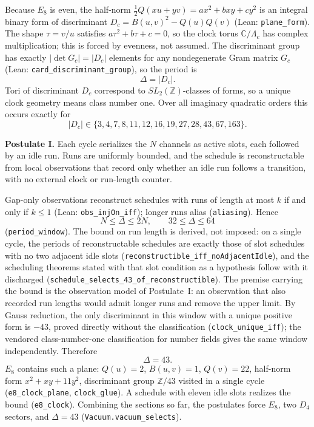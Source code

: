 Because $E_8$ is even, the half-norm $\tfrac12Q(xu+yv)=ax^2+bxy+cy^2$ is an integral binary form of discriminant $D_c=B(u,v)^2-Q(u)Q(v)$ (Lean: \texttt{plane\_form}). The shape $\tau=v/u$ satisfies $a\tau^2+b\tau+c=0$, so the clock torus $\mathbb C/\Lambda_c$ has complex multiplication; this is forced by evenness, not assumed. The discriminant group has exactly $|\det G_c|=|D_c|$ elements for any nondegenerate Gram matrix $G_c$ (Lean: \texttt{card\_discriminant\_group}), so the period is
\begin{equation}
\Delta=|D_c|.
\end{equation}
Tori of discriminant $D_c$ correspond to $SL_2(\mathbb Z)$-classes of forms\cite{silverman_advanced_1994}, so a unique clock geometry means class number one. Over all imaginary quadratic orders this occurs exactly for\cite{stark_complete_1967}
\begin{equation}
\label{eq:heegner_modulus_set}
|D_c|\in\{3,4,7,8,11,12,16,19,27,28,43,67,163\}.
\end{equation}

\label{sec:fundamental_resonance_filter2}
\label{sec:relational_time_constraint}
\textbf{Postulate I.} Each cycle serializes the $N$ channels as active slots, each followed by an idle run. Runs are uniformly bounded, and the schedule is reconstructable from local observations that record only whether an idle run follows a transition, with no external clock or run-length counter.

Gap-only observations reconstruct schedules with runs of length at most $k$ if and only if $k\le1$ (Lean: \texttt{obs\_injOn\_iff}); longer runs alias (\texttt{aliasing}). Hence
\begin{equation}
N\le\Delta\le2N,\qquad 32\le\Delta\le64
\end{equation}
(\texttt{period\_window}). The bound on run length is derived, not imposed: on a single cycle, the periods of reconstructable schedules are exactly those of slot schedules with no two adjacent idle slots (\texttt{reconstructible\_iff\_noAdjacentIdle}), and the scheduling theorems stated with that slot condition as a hypothesis follow with it discharged (\texttt{schedule\_selects\_43\_of\_reconstructible}). The premise carrying the bound is the observation model of Postulate~I: an observation that also recorded run lengths would admit longer runs and remove the upper limit. By Gauss reduction, the only discriminant in this window with a unique positive form is $-43$, proved directly without the classification (\texttt{clock\_unique\_iff}); the vendored class-number-one classification for number fields gives the same window independently. Therefore
\begin{equation}
\Delta=43.
\end{equation}
$E_8$ contains such a plane: $Q(u)=2$, $B(u,v)=1$, $Q(v)=22$, half-norm form $x^2+xy+11y^2$, discriminant group $\mathbb Z/43$ visited in a single cycle (\texttt{e8\_clock\_plane}, \texttt{clock\_glue}). A schedule with eleven idle slots realizes the bound (\texttt{e8\_clock}). Combining the sections so far, the postulates force $E_8$, two $D_4$ sectors, and $\Delta=43$ (\texttt{Vacuum.vacuum\_selects}).

